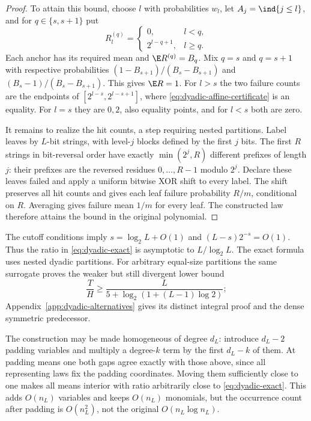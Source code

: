 \begin{proof}
To attain this bound, choose $l$ with probabilities $w_l$, let
$A_j=\ind\{j\le l\}$, and for $q\in\{s,s+1\}$ put
\[
 R_l^{(q)}=\begin{cases}0,&l<q,\\2^{l-q+1},&l\ge q.\end{cases}
\]
Each anchor has its required mean and $\E R^{(q)}=B_q$. Mix $q=s$ and
$q=s+1$ with respective probabilities
$(1-B_{s+1})/(B_s-B_{s+1})$ and $(B_s-1)/(B_s-B_{s+1})$.
This gives $\E R=1$. For $l>s$ the two failure counts are the endpoints
of $[2^{l-s},2^{l-s+1}]$, where \eqref{eq:dyadic-affine-certificate}
is an equality. For $l=s$ they are $0,2$, also equality points, and for
$l<s$ both are zero.

It remains to realize the hit counts, a step requiring nested partitions.
Label leaves by $L$-bit strings, with level-$j$ blocks defined by the first
$j$ bits. The first $R$ strings in bit-reversal order have exactly
$\min(2^j,R)$ different prefixes of length $j$: their prefixes are the
reversed residues $0,\ldots,R-1$ modulo $2^j$. Declare these leaves failed
and apply a uniform bitwise XOR shift to every label. The shift preserves
all hit counts and gives each leaf failure probability $R/m$, conditional
on $R$. Averaging gives failure mean $1/m$ for every leaf. The constructed
law therefore attains the bound in the original polynomial.
\end{proof}

The cutoff conditions imply $s=\log_2 L+O(1)$ and $(L-s)2^{-s}=O(1)$.
Thus the ratio in \eqref{eq:dyadic-exact} is asymptotic to
$L/\log_2 L$. The exact formula uses nested dyadic partitions.
For arbitrary equal-size partitions the same surrogate proves the weaker
but still divergent lower bound
\begin{equation}\label{eq:arbitrary-partitions}
 \frac{T}{H}\ge\frac{L}{5+\log_2(1+(L-1)\log2)};
\end{equation}
Appendix~\ref{app:dyadic-alternatives} gives its distinct integral proof
and the dense symmetric predecessor.

The construction may be made homogeneous of degree $d_L$: introduce
$d_L-2$ padding variables and multiply a degree-$k$ term by the first
$d_L-k$ of them. At padding means one both gaps agree exactly with those
above, since all representing laws fix the padding coordinates. Moving
them sufficiently close to one makes all means interior with ratio
arbitrarily close to \eqref{eq:dyadic-exact}. This adds $O(n_L)$ variables
and keeps $O(n_L)$ monomials, but the occurrence count after padding is
$O(n_L^2)$, not the original $O(n_L\log n_L)$.

